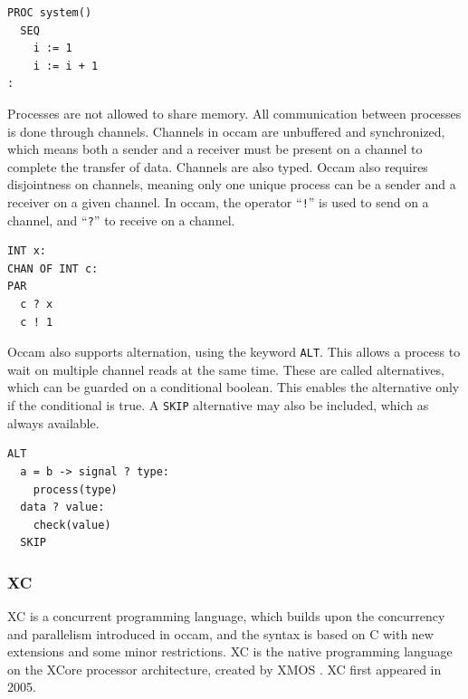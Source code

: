 \noindent\begin{minipage}{\textwidth}
\begin{lstlisting}[style={CustomC},frame={},numbers={none},xleftmargin={4em}]
PROC system()
  SEQ
    i := 1
    i := i + 1
:   
\end{lstlisting}
\end{minipage}

Processes are not allowed to share memory. All communication between processes is done through channels. Channels in occam are unbuffered and synchronized, which means both a sender and a receiver must be present on a channel to complete the transfer of data. Channels are also typed. Occam also requires disjointness on channels, meaning only one unique process can be a sender and a receiver on a given channel. In occam, the operator ``\texttt{!}'' is used to send on a channel, and ``\texttt{?}'' to receive on a channel.

\noindent\begin{minipage}{\textwidth}
\begin{lstlisting}[style={CustomC},frame={},numbers={none},xleftmargin={4em}]
INT x:
CHAN OF INT c:
PAR
  c ? x
  c ! 1
\end{lstlisting}
\end{minipage}

Occam also supports alternation, using the keyword \texttt{ALT}. This allows a process to wait on multiple channel reads at the same time. These are called alternatives, which can be guarded on a conditional boolean. This enables the alternative only if the conditional is true. A \texttt{SKIP} alternative may also be included, which as always available.

\noindent\begin{minipage}{\textwidth}
\begin{lstlisting}[style={CustomC},frame={},numbers={none},xleftmargin={4em}]
ALT
  a = b -> signal ? type:
    process(type)
  data ? value:
    check(value)
  SKIP
\end{lstlisting}
\end{minipage}


\subsubsection{XC}
\label{sssec:xc}

XC is a concurrent programming language, which builds upon the concurrency and parallelism introduced in occam, and the syntax is based on C with new extensions and some minor restrictions. XC is the native programming language on the XCore processor architecture, created by XMOS \citep{xc}. XC first appeared in 2005.

